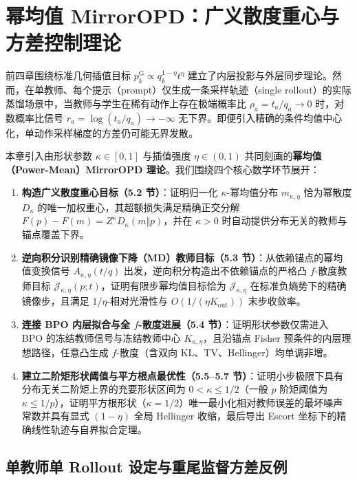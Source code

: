 \documentclass[lang=cn,scheme=chinese,openany]{elegantbook}
\begin{document}
\chapter{幂均值 MirrorOPD：广义散度重心与方差控制理论}
\label{ch:proximal-families}

前四章围绕标准几何插值目标 $p_k^{\mathrm G}\propto q_k^{1-\eta}t^\eta$ 建立了内层投影与外层同步理论。然而，在单教师、每个提示（prompt）仅生成一条采样轨迹（single rollout）的实际蒸馏场景中，当教师与学生在稀有动作上存在极端概率比 $\rho_a=t_a/q_a\to 0$ 时，对数概率比信号 $r_a=\log(t_a/q_a)\to-\infty$ 无下界。即便引入精确的条件均值中心化，单动作采样梯度的方差仍可能无界发散。

本章引入由形状参数 $\kappa\in[0,1]$ 与插值强度 $\eta\in(0,1)$ 共同刻画的\textbf{幂均值（Power-Mean）MirrorOPD 理论}。我们围绕四个核心数学环节展开：
\begin{enumerate}
\item \textbf{构造广义散度重心目标（5.2 节）}：证明归一化 $\kappa$-幂均值分布 $m_{\kappa,\eta}$ 恰为幂散度 $D_\kappa$ 的唯一加权重心，其超额损失满足精确正交分解 $F(p)-F(m)=Z^\kappa D_\kappa(m\Vert p)$，并在 $\kappa>0$ 时自动提供分布无关的教师与锚点覆盖下界。
\item \textbf{逆向积分识别精确镜像下降（MD）教师目标（5.3 节）}：从依赖锚点的幂均值变换信号 $A_{\kappa,\eta}(t/q)$ 出发，逆向积分构造出不依赖锚点的严格凸 $f$-散度教师目标 $\mathcal J_{\kappa,\eta}(p;t)$，证明有限步幂均值目标恰为 $\mathcal J_{\kappa,\eta}$ 在标准负熵势下的精确镜像步，且满足 $1/\eta$-相对光滑性与 $O(1/(\eta K_{\mathrm{out}}))$ 末步收敛率。
\item \textbf{连接 BPO 内层拟合与全 $f$-散度进展（5.4 节）}：证明形状参数仅需进入 BPO 的冻结教师信号与冻结教师中心 $K_{\kappa,\eta}$，且沿锚点 Fisher 预条件的内层理想路径，任意凸生成 $f$-散度（含双向 KL、TV、Hellinger）均单调非增。
\item \textbf{建立二阶矩形状阈值与平方根点最优性（5.5--5.7 节）}：证明小步极限下具有分布无关二阶矩上界的充要形状区间为 $0<\kappa\le 1/2$（一般 $p$ 阶矩阈值为 $\kappa\le 1/p$），证明平方根形状（$\kappa=1/2$）唯一最小化相对教师误差的最坏噪声常数并具有显式 $(1-\eta)$ 全局 Hellinger 收缩，最后导出 Escort 坐标下的精确线性轨迹与自界拟合定理。
\end{enumerate}

\section{单教师单 Rollout 设定与重尾监督方差反例}
\label{sec:power-setup}
\end{document}
